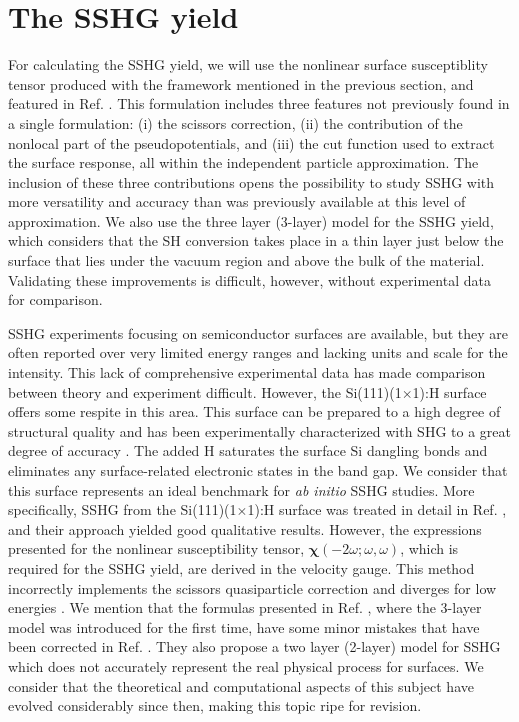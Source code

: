 
\section{The SSHG yield}

For calculating the SSHG yield, we will use the nonlinear surface susceptiblity
tensor produced with the framework mentioned in the previous section, and
featured in Ref. \cite{andersonPRB15}. This formulation includes three features
not previously found in a single formulation: (i) the scissors correction, (ii)
the contribution of the nonlocal part of the pseudopotentials, and (iii) the cut
function used to extract the surface response, all within the independent
particle approximation. The inclusion of these three contributions opens the
possibility to study SSHG with more versatility and accuracy than was previously
available at this level of approximation. We also use the three layer (3-layer)
model for the SSHG yield, which considers that the SH conversion takes place in
a thin layer just below the surface that lies under the vacuum region and above
the bulk of the material. Validating these improvements is difficult, however,
without experimental data for comparison.

SSHG experiments focusing on semiconductor surfaces are available, but they are
often reported over very limited energy ranges and lacking units and scale for
the intensity. This lack of comprehensive experimental data has made comparison
between theory and experiment difficult. However, the Si(111)(1$\times$1):H
surface offers some respite in this area. This surface can be prepared to a high
degree of structural quality and has been experimentally characterized with SHG
to a great degree of accuracy \cite{mitchellSS01, mejiaPRB02}. The added H
saturates the surface Si dangling bonds and eliminates any surface-related
electronic states in the band gap. We consider that this surface represents an
ideal benchmark for \emph{ab initio} SSHG studies. More specifically, SSHG from
the Si(111)(1$\times$1):H surface was treated in detail in Ref.
\cite{mejiaPRB02}, and their approach yielded good qualitative results.
However, the expressions presented for the nonlinear susceptibility tensor,
$\boldsymbol{\chi}(-2\omega;\omega,\omega)$, which is required for the SSHG
yield, are derived in the velocity gauge. This method incorrectly implements the
scissors quasiparticle correction and diverges for low energies
\cite{cabellosPRB09}. We mention that the formulas presented in Ref.
\cite{mejiaPRB02}, where the 3-layer model was introduced for the first time,
have some minor mistakes that have been corrected in Ref.
\cite{andersonARXIV16}. They also propose a two layer (2-layer) model for SSHG
which does not accurately represent the real physical process for surfaces. We
consider that the theoretical and computational aspects of this subject have
evolved considerably since then, making this topic ripe for revision.

